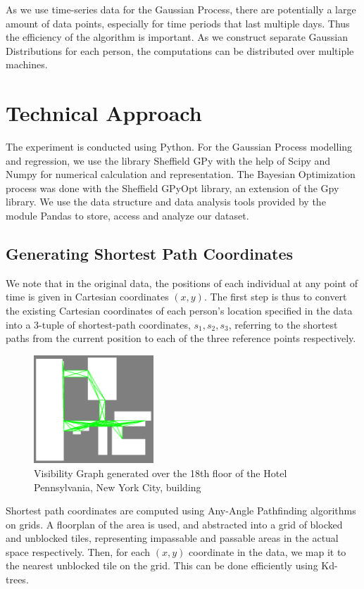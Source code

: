 \documentclass[letterpaper]{article}
\begin{document}
As we use time-series data for the Gaussian Process, there are potentially a large amount of data points, especially for time periods that last multiple days. Thus the efficiency of the algorithm is important. As we construct separate Gaussian Distributions for each person, the computations can be distributed over multiple machines.


\section{Technical Approach}
The experiment is conducted using Python. For the Gaussian Process modelling and regression, we use the library Sheffield GPy with the help of Scipy and Numpy for numerical calculation and representation. The Bayesian Optimization process was done with the Sheffield GPyOpt library, an extension of the Gpy library. We use the data structure and data analysis tools provided by the module Pandas to store, access and analyze our dataset.

\subsection{Generating Shortest Path Coordinates}

We note that in the original data, the positions of each individual at any point of time is given in Cartesian coordinates $(x,y)$. The first step is thus to convert the existing Cartesian coordinates of each person's location specified in the data into a 3-tuple of shortest-path coordinates, $s_1, s_2, s_3$, referring to the shortest paths from the current position to each of the three reference points respectively.\\

\begin{figure}[!h]
  \centering
    \includegraphics[width=170px]{diagrams/floor18visibilitygraph.png}
  \caption{Visibility Graph generated over the 18th floor of the Hotel Pennsylvania, New York City, building}
  \label{fig:floor18vg}
\end{figure}

Shortest path coordinates are computed using Any-Angle Pathfinding algorithms on grids. A floorplan of the area is used, and abstracted into a grid of blocked and unblocked tiles, representing impassable and passable areas in the actual space respectively. Then, for each $(x,y)$ coordinate in the data, we map it to the nearest unblocked tile on the grid. This can be done efficiently using Kd-trees.\\
\end{document}

